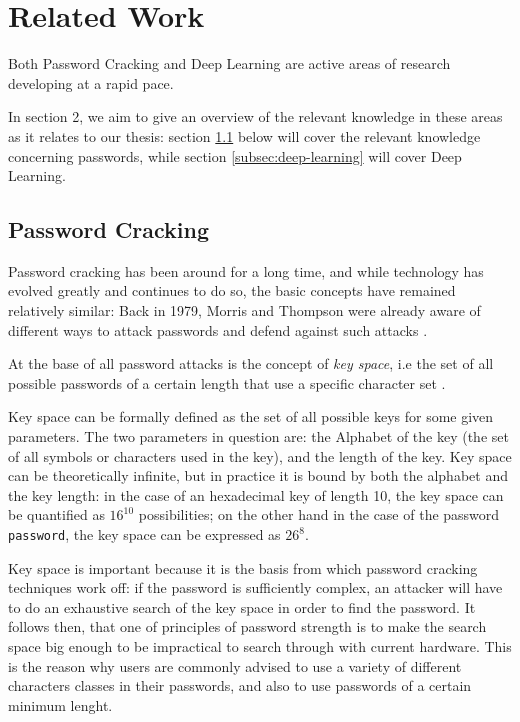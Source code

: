 

\section{Related Work}\label{sec:related_work}
Both Password Cracking and Deep Learning are active areas of research developing at a rapid pace.

In section 2, we aim to give an overview of the relevant knowledge in these areas as it relates to our thesis: section \ref{subsec:password_cracking} below will cover the relevant knowledge concerning passwords, while section \ref{subsec:deep-learning} will cover Deep Learning.

\subsection{Password Cracking}\label{subsec:password_cracking}
Password cracking has been around for a long time, and while technology has evolved greatly and continues to do so, the basic concepts have remained relatively similar:
Back in 1979, Morris and Thompson were already aware of different ways to attack passwords and defend against such attacks \cite{Thompson1979}.

At the base of all password attacks is the concept of \emph{key space}, i.e the set of all possible passwords of a certain length that use a specific character set \cite{Thompson1979,hash_cat_mask_attack}. 

Key space can be formally defined as the set of all possible keys for some given parameters. The two parameters in question are: the Alphabet of the key (the set of all symbols or characters used in the key), and the length of the key.
Key space can be theoretically infinite, but in practice it is bound by both the alphabet and the key length: in the case of an hexadecimal key of length 10, the key space can be quantified as $16^{10}$ possibilities; on the other hand in the case of the password \texttt{password}, the key space can be expressed as $26^8$. %

Key space is important because it is the basis from which password cracking techniques work off: if the password is sufficiently complex, an attacker will have to do an exhaustive search of the key space in order to find the password. 
It follows then, that one of principles of password strength is to make the search space big enough to be impractical to search through with current hardware.
This is the reason why users are commonly advised to use a variety of different characters classes in their passwords, and also to use passwords of a certain minimum lenght.

